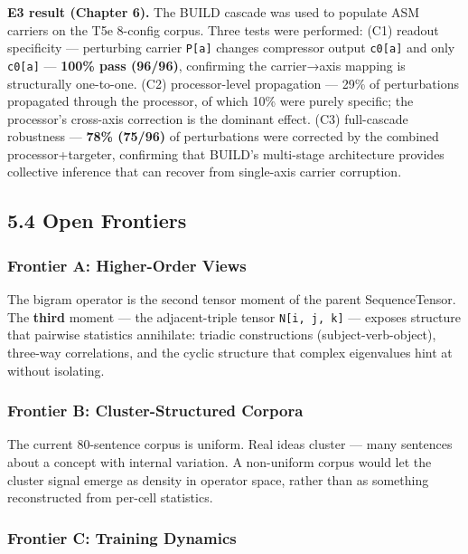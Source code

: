 \documentclass[
  twocolumn,
  10pt,
  a4paper]{article}
\begin{document}
\textbf{E3 result (Chapter 6).} The BUILD cascade was used to populate
ASM carriers on the T5e 8-config corpus. Three tests were performed:
(C1) readout specificity --- perturbing carrier \texttt{P{[}a{]}}
changes compressor output \texttt{c0{[}a{]}} and only \texttt{c0{[}a{]}}
--- \textbf{100\% pass (96/96)}, confirming the carrier→axis mapping is
structurally one-to-one. (C2) processor-level propagation --- 29\% of
perturbations propagated through the processor, of which 10\% were
purely specific; the processor's cross-axis correction is the dominant
effect. (C3) full-cascade robustness --- \textbf{78\% (75/96)} of
perturbations were corrected by the combined processor+targeter,
confirming that BUILD's multi-stage architecture provides collective
inference that can recover from single-axis carrier corruption.

\hypertarget{open-frontiers}{%
\subsection{5.4 Open Frontiers}\label{open-frontiers}}

\hypertarget{frontier-a-higher-order-views}{%
\subsubsection{Frontier A: Higher-Order
Views}\label{frontier-a-higher-order-views}}

The bigram operator is the second tensor moment of the parent
SequenceTensor. The \textbf{third} moment --- the adjacent-triple tensor
\texttt{N{[}i,\ j,\ k{]}} --- exposes structure that pairwise statistics
annihilate: triadic constructions (subject-verb-object), three-way
correlations, and the cyclic structure that complex eigenvalues hint at
without isolating.

\hypertarget{frontier-b-cluster-structured-corpora}{%
\subsubsection{Frontier B: Cluster-Structured
Corpora}\label{frontier-b-cluster-structured-corpora}}

The current 80-sentence corpus is uniform. Real ideas cluster --- many
sentences about a concept with internal variation. A non-uniform corpus
would let the cluster signal emerge as density in operator space, rather
than as something reconstructed from per-cell statistics.

\hypertarget{frontier-c-training-dynamics}{%
\subsubsection{Frontier C: Training
Dynamics}\label{frontier-c-training-dynamics}}
\end{document}
